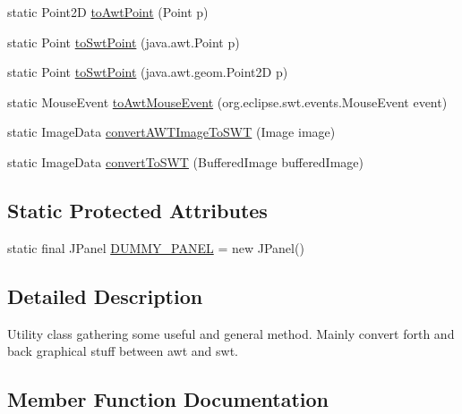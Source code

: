 \begin{DoxyCompactItemize}
\item 
static Point2D \mbox{\hyperlink{classorg_1_1jfree_1_1experimental_1_1swt_1_1_s_w_t_utils_a37dca36eab604131de7d92e9a033df38}{to\+Awt\+Point}} (Point p)
\item 
static Point \mbox{\hyperlink{classorg_1_1jfree_1_1experimental_1_1swt_1_1_s_w_t_utils_ac5948a1b7eb5ad479ea2084cba3cd4a7}{to\+Swt\+Point}} (java.\+awt.\+Point p)
\item 
static Point \mbox{\hyperlink{classorg_1_1jfree_1_1experimental_1_1swt_1_1_s_w_t_utils_a7e5ac0c319f4b73df5e96e7f656ed1bd}{to\+Swt\+Point}} (java.\+awt.\+geom.\+Point2D p)
\item 
static Mouse\+Event \mbox{\hyperlink{classorg_1_1jfree_1_1experimental_1_1swt_1_1_s_w_t_utils_a65873a6e76391c4a773e1c62e438d089}{to\+Awt\+Mouse\+Event}} (org.\+eclipse.\+swt.\+events.\+Mouse\+Event event)
\item 
static Image\+Data \mbox{\hyperlink{classorg_1_1jfree_1_1experimental_1_1swt_1_1_s_w_t_utils_a9ff63e1b79cfc44265f3ca5a299c1d81}{convert\+A\+W\+T\+Image\+To\+S\+WT}} (Image image)
\item 
static Image\+Data \mbox{\hyperlink{classorg_1_1jfree_1_1experimental_1_1swt_1_1_s_w_t_utils_afd4c7078d47c41b35b3a4adcd98a73fe}{convert\+To\+S\+WT}} (Buffered\+Image buffered\+Image)
\end{DoxyCompactItemize}
\subsection*{Static Protected Attributes}
\begin{DoxyCompactItemize}
\item 
static final J\+Panel \mbox{\hyperlink{classorg_1_1jfree_1_1experimental_1_1swt_1_1_s_w_t_utils_aa8f2a5fd8c4bb9531fb489b3bddbbb63}{D\+U\+M\+M\+Y\+\_\+\+P\+A\+N\+EL}} = new J\+Panel()
\end{DoxyCompactItemize}


\subsection{Detailed Description}
Utility class gathering some useful and general method. Mainly convert forth and back graphical stuff between awt and swt. 

\subsection{Member Function Documentation}
\mbox{\label{classorg_1_1jfree_1_1experimental_1_1swt_1_1_s_w_t_utils_a9ff63e1b79cfc44265f3ca5a299c1d81}} 
